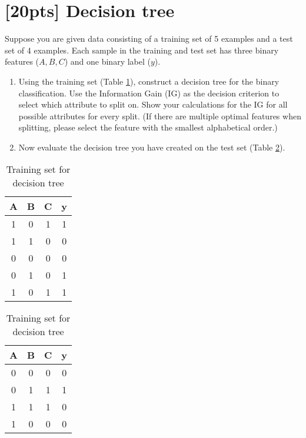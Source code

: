 \documentclass{article}
\begin{document}
    \section{[20pts] Decision tree}
    Suppose you are given data consisting of a training set of 5 examples and a test set of 4 examples.
    Each sample in the training and test set has three binary features ($A, B, C$) and one binary label ($y$).
    \begin{enumerate}[(1)]
        \item Using the training set (Table \ref{dt:trs}), construct a decision tree for the binary classification. 
        Use the Information Gain (IG) as the decision criterion to select which attribute to split on. 
        Show your calculations for the IG for all possible attributes for every split. 
        (If there are multiple optimal features when splitting, please select the feature with the smallest alphabetical order.)
        \item Now evaluate the decision tree you have created on the test set (Table \ref{dt:tes}).
    \end{enumerate}
    \begin{table}[h!]
		\centering
		\begin{tabular}{ccc|c}
			\hline
			A & B & C & y\\
			\hline
			1 & 0 & 1 & 1 \\
            1 & 1 & 0 & 0 \\
            0 & 0 & 0 & 0 \\
            0 & 1 & 0 & 1 \\
            1 & 0 & 1 & 1 \\
			\hline
		\end{tabular}
        \caption{Training set for decision tree}
        \label{dt:trs}
	\end{table}
    \begin{table}[h!]
		\centering
		\begin{tabular}{ccc|c}
			\hline
			A & B & C & y\\
			\hline
			0 & 0 & 0 & 0 \\
            0 & 1 & 1 & 1 \\
            1 & 1 & 1 & 0 \\
            1 & 0 & 0 & 0 \\
			\hline
		\end{tabular}
        \caption{Training set for decision tree}
        \label{dt:tes}
	\end{table}
    
\end{document}
